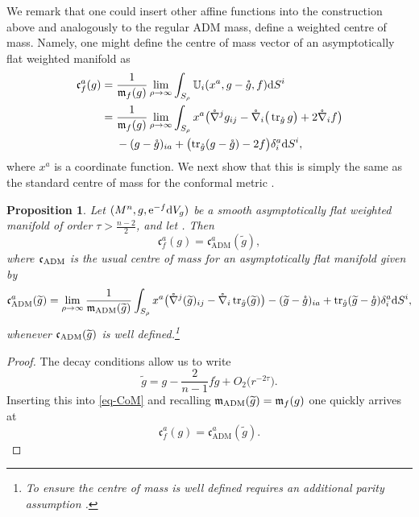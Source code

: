 \documentclass[pdftex]{sigma}
\numberwithin{equation}{section}
\newtheorem{Proposition}[Theorem]{Proposition}
\theoremstyle{definition}
\begin{document}
We remark that one could insert other affine functions into the construction above and analogously to the regular ADM mass, define a weighted centre of mass. Namely, one might define the centre of mass vector of an asymptotically flat weighted manifold as
\begin{align*}
		\mathfrak c^a_f(g)={}&\frac{1}{\mathfrak{m}_f(g)}\lim_{\rho\to\infty}\int_{S_\rho}\mathbb U_i(x^a,g-\mathring g,f){\rm d}S^i\\		={}&\frac{1}{\mathfrak{m}_f(g)}\lim_{\rho\to\infty}\int_{S_\rho}x^a\bigl(\mathring{\nabla}^{j}g_{ij}-\mathring{\nabla}_i\big(\operatorname{tr}_{\mathring g}g\big)+2 \mathring{\nabla}_if\bigr)
		\\ &  -(g-\mathring g)_{ia}
		+\bigl(\operatorname{tr}_{\mathring g}(g-\mathring g)-2f\bigr)\delta_i^a {\rm d}S^i,
\end{align*}
where $x^a$ is a coordinate function. We next show that this is simply the same as the standard centre of mass for the conformal metric .
\begin{Proposition}
	Let $(M^n,g,{\rm e}^{-f}{\rm d}V_g)$ be a smooth asymptotically flat weighted manifold of order $\tau>\frac{n-2}{2}$, and let . Then
	\[
	\mathfrak c^a_f(g)=\mathfrak c^a_{\mathrm{ADM}}(\widetilde g ),
	\]
	where $\mathfrak c_{\rm ADM}$ is the usual centre of mass for an asymptotically flat manifold given by
	\begin{gather} \label{eq-CoM}
			\mathfrak c_{\rm ADM}^a(\widetilde g) =\lim_{\rho\to\infty}\frac{1}{\mathfrak{m}_{\rm ADM}(\widetilde g)}\int_{S_\rho}
			x^a\bigl(\mathring\nabla^j(\widetilde g)_{ij}-\mathring\nabla_i\operatorname{tr}_{\mathring g}(\widetilde g)\bigr)
			-(\widetilde g -\mathring g)_{ia}+\operatorname{tr}_{\mathring g}(\widetilde g-\mathring g) \delta_i^{ a}{\rm d}S^i,
	\end{gather}
	whenever $\mathfrak c_{\rm ADM}(\widetilde g)$ is well defined.\footnote{ To ensure the centre of mass is well defined requires an additional parity assumption \cite{ReggeTeitelboim74}.}
\end{Proposition}
\begin{proof}
	The decay conditions allow us to write
	\begin{equation*}%
		\widetilde g
		= g - \frac{2}{n-1}f \mathring g + O_2\bigl(r^{-2\tau}\bigr).
	\end{equation*}
	Inserting this into \eqref{eq-CoM} and recalling $\mathfrak{m}_{\rm ADM}(\widetilde g)=\mathfrak{m}_f(g)$ one quickly arrives at
	\[
	\mathfrak c^a_f(g)=\mathfrak c^a_{\mathrm{ADM}}(\widetilde g). \tag*{\qed}
	\]\renewcommand{\qed}{}
\end{proof}
\end{document}
